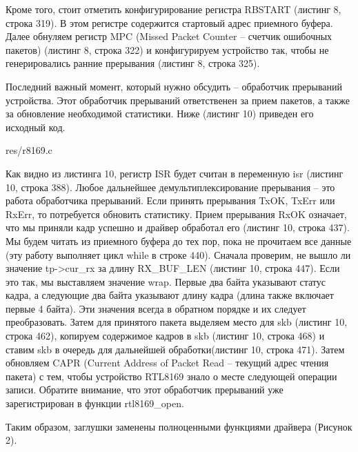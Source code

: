Кроме того, стоит отметить конфигурирование регистра RBSTART (листинг 8, строка 319). В этом регистре содержится стартовый адрес приемного буфера. Далее обнуляем регистр MPC (Missed Packet Counter – счетчик ошибочных пакетов) (листинг 8, строка 322) и конфигурируем устройство так, чтобы не генерировались ранние прерывания (листинг 8, строка 325).

Последний важный момент, который нужно обсудить -- обработчик прерываний устройства. Этот обработчик прерываний ответственен за прием пакетов, а также за обновление необходимой статистики. Ниже (листинг 10) приведен его исходный код.


{res/r8169.c}

Как видно из листинга 10, регистр ISR будет считан в переменную isr (листинг 10, строка 388). Любое дальнейшее демультиплексирование прерывания -- это работа обработчика прерываний. Если принять прерывания TxOK, TxErr или RxErr, то потребуется обновить статистику. Прием прерывания RxOK означает, что мы приняли кадр успешно и драйвер обработал его (листинг 10, строка 437). Мы будем читать из приемного буфера до тех пор, пока не прочитаем все данные (эту работу выполняет цикл while в строке 440). Сначала проверим, не вышло ли значение tp->cur\_rx за длину RX\_BUF\_LEN (листинг 10, строка 447). Если это так, мы выставляем значение wrap. Первые два байта указывают статус кадра, а следующие два байта указывают длину кадра (длина также включает первые 4 байта)\cite{Realtech}. Эти значения всегда в обратном порядке и их следует преобразовать. Затем для принятого пакета выделяем место для skb (листинг 10, строка 462), копируем содержимое кадров в skb (листинг 10, строка 468) и ставим skb в очередь для дальнейшей обработки(листинг 10, строка 471). Затем обновляем CAPR (Current Address of Packet Read -- текущий адрес чтения пакета) с тем, чтобы устройство RTL8169 знало о месте следующей операции записи. Обратите внимание, что этот обработчик прерываний уже зарегистрирован в функции rtl8169\_open.

Таким образом, заглушки заменены полноценными функциями драйвера (Рисунок 2).

